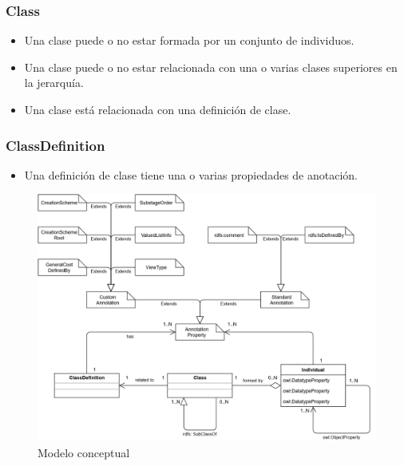 \subsubsection{Class}
\begin{itemize}
    \item Una clase puede o no estar formada por un conjunto de individuos.
    \item Una clase puede o no estar relacionada con una o varias clases superiores en la jerarquía.
    \item Una clase está relacionada con una definición de clase.
\end{itemize}

\subsubsection{ClassDefinition}
\begin{itemize}
    \item Una definición de clase tiene una o varias propiedades de anotación.
\end{itemize}

\begin{figure}[H]
    \centering
    \includegraphics[scale=0.65]{Figures/Modelo_Conceptual.jpg}
    \caption{Modelo conceptual}
    \label{Modelo_conceptual}
\end{figure}

